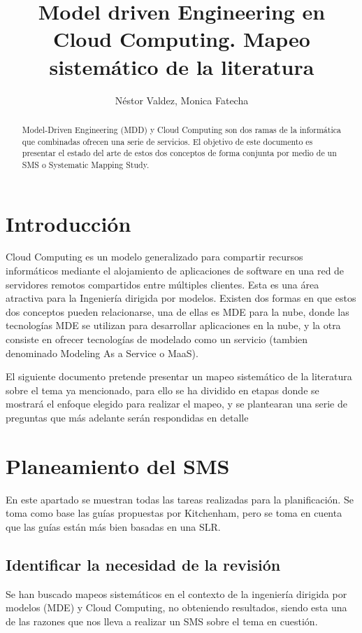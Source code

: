 \documentclass{llncs}
\begin{document}
\title{Model driven Engineering en Cloud Computing. Mapeo sistemático de la literatura}

\author{Néstor Valdez, Monica Fatecha}
\maketitle

\begin{abstract}
Model-Driven Engineering (MDD) y Cloud Computing son dos ramas de la informática que combinadas ofrecen una serie de servicios. El objetivo de este documento
es presentar el estado del arte de estos dos conceptos de forma conjunta por medio de un SMS o Systematic Mapping Study.
\end{abstract}

\section{Introducción}\label{sec:Introduction}
Cloud Computing es un modelo generalizado para compartir recursos informáticos mediante el alojamiento de aplicaciones
de software en una red de servidores remotos compartidos entre múltiples clientes. Esta es una área atractiva para la Ingeniería
dirigida por modelos. Existen dos formas en que estos dos conceptos pueden relacionarse, una de ellas es MDE para la nube, donde las
tecnologías MDE se utilizan para desarrollar aplicaciones en la nube, y la otra consiste en ofrecer tecnologías de modelado como un servicio
(tambien denominado Modeling As a Service o MaaS).

El siguiente documento pretende presentar un mapeo sistemático de la literatura sobre el tema ya mencionado, para ello se ha dividido
en etapas donde se mostrará el enfoque elegido para realizar el mapeo, y se plantearan una serie de preguntas que más adelante serán respondidas en detalle

\section{Planeamiento del SMS}\label{sec:Planning}
En este apartado se muestran todas las tareas realizadas para la planificación. Se toma como base las guías propuestas por
Kitchenham\cite{slr}, pero se toma en cuenta que las guías están más bien basadas en una SLR.
\subsection{Identificar la necesidad de la revisión}
Se han buscado mapeos sistemáticos en el contexto de la ingeniería dirigida por modelos (MDE) y Cloud Computing, no obteniendo
resultados, siendo esta una de las razones que nos lleva a realizar un SMS sobre el tema en cuestión.
\end{document}
